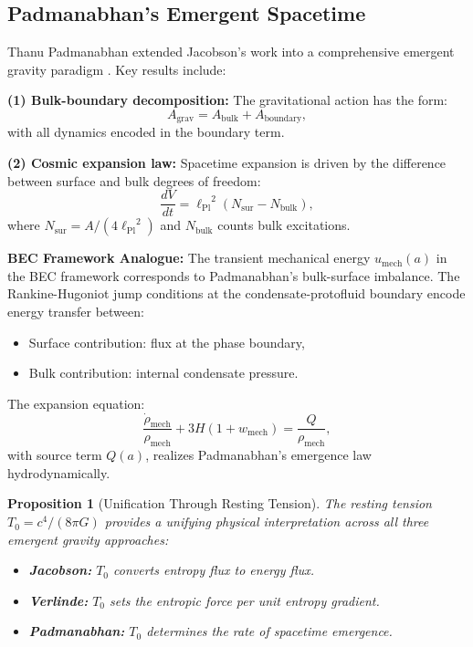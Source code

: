 \documentclass[11pt,a4paper]{article}
\newcommand{\lPl}{\ensuremath{\ell_{\mathrm{Pl}}}}
\newcommand{\Tzero}{\ensuremath{T_0}}
\newcommand{\umech}{\ensuremath{u_{\mathrm{mech}}}}
\newcommand{\wmech}{\ensuremath{w_{\mathrm{mech}}}}
\newtheorem{proposition}[theorem]{Proposition}
\theoremstyle{definition}
\theoremstyle{remark}
\begin{document}
\subsection{Padmanabhan's Emergent Spacetime}
\label{sec:padmanabhan}

Thanu Padmanabhan extended Jacobson's work into a comprehensive emergent gravity paradigm \cite{Padmanabhan2010,Padmanabhan2015}. Key results include:

\textbf{(1) Bulk-boundary decomposition:} The gravitational action has the form:
\begin{equation}
A_{\mathrm{grav}} = A_{\mathrm{bulk}} + A_{\mathrm{boundary}},
\end{equation}
with all dynamics encoded in the boundary term.

\textbf{(2) Cosmic expansion law:} Spacetime expansion is driven by the difference between surface and bulk degrees of freedom:
\begin{equation}
\label{eq:padmanabhan_expansion}
\frac{dV}{dt} = \lPl^2 (N_{\mathrm{sur}} - N_{\mathrm{bulk}}),
\end{equation}
where $N_{\mathrm{sur}} = A/(4\lPl^2)$ and $N_{\mathrm{bulk}}$ counts bulk excitations.

\textbf{BEC Framework Analogue:} The transient mechanical energy $\umech(a)$ in the BEC framework corresponds to Padmanabhan's bulk-surface imbalance. The Rankine-Hugoniot jump conditions at the condensate-protofluid boundary encode energy transfer between:
\begin{itemize}
\item Surface contribution: flux at the phase boundary,
\item Bulk contribution: internal condensate pressure.
\end{itemize}

The expansion equation:
\begin{equation}
\frac{\dot{\rho}_{\mathrm{mech}}}{\rho_{\mathrm{mech}}} + 3H(1 + \wmech) = \frac{Q}{\rho_{\mathrm{mech}}},
\end{equation}
with source term $Q(a)$, realizes Padmanabhan's emergence law hydrodynamically.

\begin{proposition}[Unification Through Resting Tension]
The resting tension $\Tzero = c^4/(8\pi G)$ provides a unifying physical interpretation across all three emergent gravity approaches:
\begin{itemize}
\item \textbf{Jacobson:} $\Tzero$ converts entropy flux to energy flux.
\item \textbf{Verlinde:} $\Tzero$ sets the entropic force per unit entropy gradient.
\item \textbf{Padmanabhan:} $\Tzero$ determines the rate of spacetime emergence.
\end{itemize}
\end{proposition}
\end{document}
